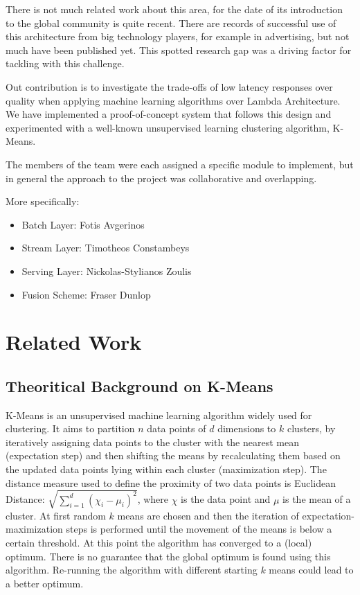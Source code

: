 \documentclass{lmproj}
\begin{document}
There is not much related work about this area, for the date of its introduction to the global community is quite recent. There are records of successful use of this architecture from big technology players, for example in advertising, but not much have been published yet. This spotted research gap was a driving factor for tackling with this challenge.

Out contribution is to investigate the trade-offs of low latency responses over quality when applying machine learning algorithms over Lambda Architecture. We have implemented a proof-of-concept system that follows this design and experimented with a well-known unsupervised learning clustering algorithm, K-Means. 

The members of the team were each assigned a specific module to implement, but in general the approach to the project was collaborative and overlapping. 

More specifically:
\begin{itemize}
	\item Batch Layer: Fotis Avgerinos
	\item Stream Layer: Timotheos Constambeys
	\item Serving Layer: Nickolas-Stylianos Zoulis
	\item Fusion Scheme: Fraser Dunlop
\end{itemize}


\chapter{Related Work}
\label{relatedwork}

\section{Theoritical Background on K-Means}
\label{relatedwork}

K-Means is an unsupervised machine learning algorithm widely used for clustering. It aims to partition $n$ data points of $d$ dimensions to $k$ clusters, by iteratively assigning data points to the cluster with the nearest mean (expectation step) and then shifting the means by recalculating them based on the updated data points lying within each cluster (maximization step). The distance measure used to define the proximity of two data points is Euclidean Distance: $\sqrt{\sum_{i=1}^{d} ({\chi_i - \mu_i})^2}$, where $\chi$ is the data point and  $\mu$ is the mean of a cluster. At first random $k$ means are chosen and then the iteration of expectation-maximization steps is performed until the movement of the means is below a certain threshold. At this point the algorithm has converged to a (local) optimum. There is no guarantee that the global optimum is found using this algorithm. Re-running the algorithm with different starting $k$ means could lead to a better optimum.
\end{document}
